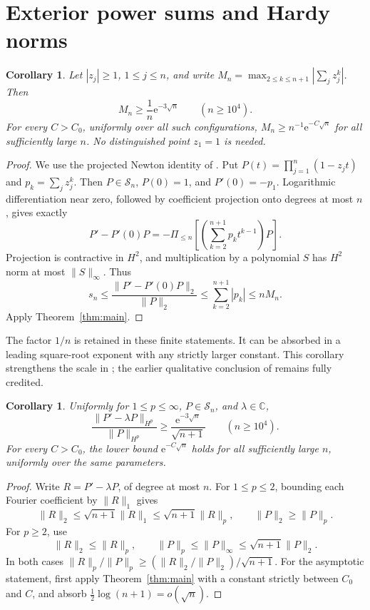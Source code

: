 \documentclass[11pt]{article}
\newtheorem{corollary}[theorem]{Corollary}
\theoremstyle{remark}\newtheorem{remark}[theorem]{Remark}
\newcommand{\C}{\mathbb C}
\newcommand{\norm}[1]{\lVert #1\rVert}
\newcommand{\ee}{\mathrm e}
\begin{document}
\section{Exterior power sums and Hardy norms}\label{sec:power}
\begin{corollary}\label{cor:powers}
Let \(|z_j|\ge1\), \(1\le j\le n\), and write
\(M_n=\max_{2\le k\le n+1}|\sum_jz_j^k|\).
Then
\[
 M_n\ge\frac1n\ee^{-3\sqrt n}\qquad(n\ge10^4).
\]
For every \(C>C_0\), uniformly over all such configurations,
\(M_n\ge n^{-1}\ee^{-C\sqrt n}\) for all sufficiently large \(n\).
No distinguished point \(z_1=1\) is needed.
\end{corollary}
\begin{proof}
We use the projected Newton identity of
\cite[Proposition 3.1]{tan}. Put
\(P(t)=\prod_{j=1}^n(1-z_jt)\) and \(p_k=\sum_jz_j^k\).
Then \(P\in\mathcal S_n\), \(P(0)=1\), and \(P'(0)=-p_1\).
Logarithmic differentiation near zero, followed by coefficient
projection onto degrees at most \(n\), gives exactly
\[
 P'-P'(0)P=-\Pi_{\le n}
       \left[\left(\sum_{k=2}^{n+1}p_kt^{k-1}\right)P\right].
\]
Projection is contractive in \(H^2\), and multiplication by a
polynomial \(S\) has \(H^2\) norm at most \(\norm S_\infty\).
Thus
\[
 s_n\le\frac{\norm{P'-P'(0)P}_2}{\norm P_2}
       \le\sum_{k=2}^{n+1}|p_k|\le nM_n.
\]
Apply Theorem~\ref{thm:main}.
\end{proof}

The factor \(1/n\) is retained in these finite statements.
It can be absorbed in a leading square-root exponent with any
strictly larger constant. This corollary strengthens the scale in
\cite{tan}; the earlier qualitative conclusion of \cite{luo} remains
fully credited.

\begin{corollary}\label{cor:hp}
Uniformly for \(1\le p\le\infty\), \(P\in\mathcal S_n\), and
\(\lambda\in\C\),
\[
 \frac{\norm{P'-\lambda P}_{H^p}}{\norm P_{H^p}}
       \ge\frac{\ee^{-3\sqrt n}}{\sqrt{n+1}}\qquad(n\ge10^4).
\]
For every \(C>C_0\), the lower bound \(\ee^{-C\sqrt n}\) holds
for all sufficiently large \(n\), uniformly over the same parameters.
\end{corollary}
\begin{proof}
Write \(R=P'-\lambda P\), of degree at most \(n\).
For \(1\le p\le2\), bounding each Fourier coefficient by
\(\norm R_1\) gives
\[
 \norm R_2\le\sqrt{n+1}\norm R_1
       \le\sqrt{n+1}\norm R_p,\qquad
 \norm P_2\ge\norm P_p.
\]
For \(p\ge2\), use
\[
 \norm R_2\le\norm R_p,\qquad
 \norm P_p\le\norm P_\infty\le\sqrt{n+1}\norm P_2.
\]
In both cases \(\norm R_p/\norm P_p\ge
(\norm R_2/\norm P_2)/\sqrt{n+1}\).
For the asymptotic statement, first apply Theorem~\ref{thm:main}
with a constant strictly between \(C_0\) and \(C\), and absorb
\(\tfrac12\log(n+1)=o(\sqrt n)\).
\end{proof}
\end{document}
